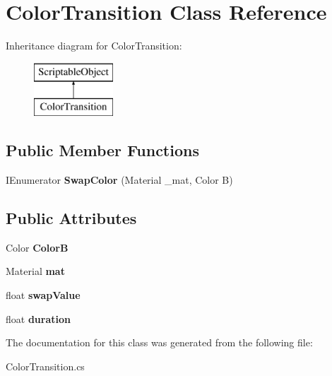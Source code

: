 \hypertarget{class_color_transition}{}\section{Color\+Transition Class Reference}
\label{class_color_transition}
Inheritance diagram for Color\+Transition\+:\begin{figure}[H]
\begin{center}
\leavevmode
\includegraphics[height=2.000000cm]{class_color_transition}
\end{center}
\end{figure}
\subsection*{Public Member Functions}
\begin{DoxyCompactItemize}
\item 
\mbox{\label{class_color_transition_a6847c2bd73b2e3ba61d7b40b9bdfcece}} 
I\+Enumerator {\bfseries Swap\+Color} (Material \+\_\+mat, Color B)
\end{DoxyCompactItemize}
\subsection*{Public Attributes}
\begin{DoxyCompactItemize}
\item 
\mbox{\label{class_color_transition_a9e087042afcc0f0b15a34e6e169929ca}} 
Color {\bfseries ColorB}
\item 
\mbox{\label{class_color_transition_a0e62c2c0867491712081253f77e2cc4e}} 
Material {\bfseries mat}
\item 
\mbox{\label{class_color_transition_a23b872d57138292d6b6080e80ac437bf}} 
float {\bfseries swap\+Value}
\item 
\mbox{\label{class_color_transition_ac163cb483b00da7ea1b54c26e07c1fee}} 
float {\bfseries duration}
\end{DoxyCompactItemize}


The documentation for this class was generated from the following file\+:\begin{DoxyCompactItemize}
\item 
Color\+Transition.\+cs\end{DoxyCompactItemize}
